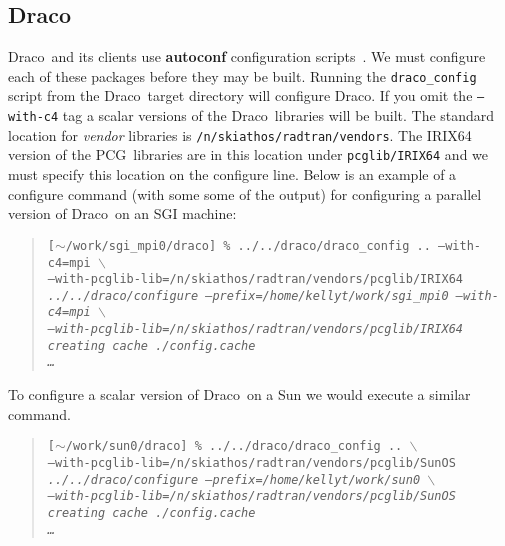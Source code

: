 \documentclass[11pt]{nmemo}
\newcommand{\comp}[1]{\normalfont\normalsize\texttt{#1}}
\newcommand{\draco}{{\normalfont\sffamily Draco}}
\newcommand{\pcg}{{\normalfont\sffamily PCG}}
\begin{document}
\subsection{\draco}

\draco\ and its clients use \textbf{autoconf} configuration
scripts~\cite{autoconf}.  We must configure each of these packages
before they may be built.  Running the \comp{draco\_config} script
from the \draco\ target directory will configure \draco.  If you omit
the \comp{--with-c4} tag a scalar versions of the \draco\ libraries
will be built.  The standard location for \emph{vendor} libraries is
\comp{/n/skiathos/radtran/vendors}.  The IRIX64 version of the \pcg\ 
libraries are in this location under \comp{pcglib/IRIX64} and we must
specify this location on the configure line.  Below is an example of a
configure command (with some some of the output) for configuring a
parallel version of \draco\ on an SGI machine:

\begin{verse}
\texttt{[$\sim$/work/sgi\_mpi0/draco] \% ../../draco/draco\_config .. --with-c4=mpi $\backslash$\\
\hspace{0.5in}--with-pcglib-lib=/n/skiathos/radtran/vendors/pcglib/IRIX64 \\
\emph{../../draco/configure --prefix=/home/kellyt/work/sgi\_mpi0 --with-c4=mpi $\backslash$\\
\hspace{0.5in}--with-pcglib-lib=/n/skiathos/radtran/vendors/pcglib/IRIX64\\
creating cache ./config.cache\\
\hspace{1.0in} \ldots }}
\end{verse}

To configure a scalar version of \draco\ on a Sun we would execute a
similar command.

\begin{verse}
\texttt{[$\sim$/work/sun0/draco] \% ../../draco/draco\_config .. $\backslash$\\
\hspace{0.5in}--with-pcglib-lib=/n/skiathos/radtran/vendors/pcglib/SunOS \\
\emph{../../draco/configure --prefix=/home/kellyt/work/sun0 $\backslash$\\
\hspace{0.5in}--with-pcglib-lib=/n/skiathos/radtran/vendors/pcglib/SunOS\\
creating cache ./config.cache\\
\hspace{1.0in} \ldots }}
\end{verse}
\end{document}
